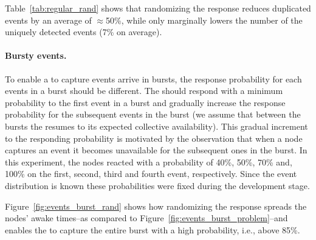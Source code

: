 Table~\ref{tab:regular_rand} shows that randomizing the response reduces duplicated events by an average of $\approx$50\%, while only marginally lowers the number of the uniquely detected events (7\% on average). 


\paragraph{Bursty events.}
To enable a \cis to capture events arrive in bursts, the response probability for each events in a burst should be different. The \cis should respond with a minimum probability to the first event in a burst and gradually increase the response probability for the subsequent events in the burst (we assume that between the bursts the \cis resumes to its expected collective availability). This gradual increment to the responding probability is motivated by the observation that when a node captures an event it becomes unavailable for the subsequent ones in the burst.
In this experiment, the nodes reacted with a probability of 40\%, 50\%, 70\% and, 100\% on the first, second, third and fourth event, respectively. Since the event distribution is known these probabilities were fixed during the development stage.

Figure~\ref{fig:events_burst_rand} shows how randomizing the \cis response spreads the nodes' awake times--as compared to Figure~\ref{fig:events_burst_problem}--and enables the \cis to capture the entire burst with a high probability, i.e., above 85\%. 





